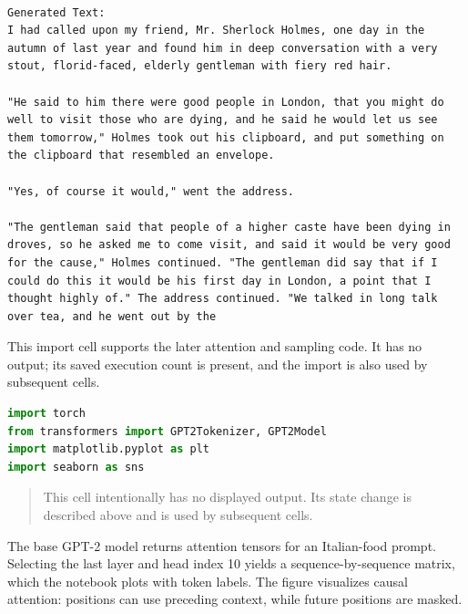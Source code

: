 \documentclass[../labs.tex]{subfiles}
\begin{document}
\begin{lstlisting}[style=terminalOutput,breakatwhitespace=false,columns=fullflexible]

Generated Text:
I had called upon my friend, Mr. Sherlock Holmes, one day in the autumn of last year and found him in deep conversation with a very stout, florid-faced, elderly gentleman with fiery red hair.

"He said to him there were good people in London, that you might do well to visit those who are dying, and he said he would let us see them tomorrow," Holmes took out his clipboard, and put something on the clipboard that resembled an envelope.

"Yes, of course it would," went the address.

"The gentleman said that people of a higher caste have been dying in droves, so he asked me to come visit, and said it would be very good for the cause," Holmes continued. "The gentleman did say that if I could do this it would be his first day in London, a point that I thought highly of." The address continued. "We talked in long talk over tea, and he went out by the

\end{lstlisting}


This import cell supports the later attention and sampling code. It has no output; its saved execution count is present, and the import is also used by subsequent cells.


\begin{lstlisting}[language=Python,basicstyle=\ttfamily\scriptsize,breaklines=true,breakatwhitespace=false,columns=fullflexible,keepspaces=true,numbers=none]
import torch
from transformers import GPT2Tokenizer, GPT2Model
import matplotlib.pyplot as plt
import seaborn as sns
\end{lstlisting}

\hypertarget{out:lab03-gpt2-c03}{}\label{out:lab03-gpt2-c03}

\begin{quote}\small This cell intentionally has no displayed output. Its state change is described above and is used by subsequent cells.\end{quote}


The base GPT-2 model returns attention tensors for an Italian-food prompt. Selecting the last layer and head index 10 yields a sequence-by-sequence matrix, which the notebook plots with token labels. The figure visualizes causal attention: positions can use preceding context, while future positions are masked.
\end{document}
